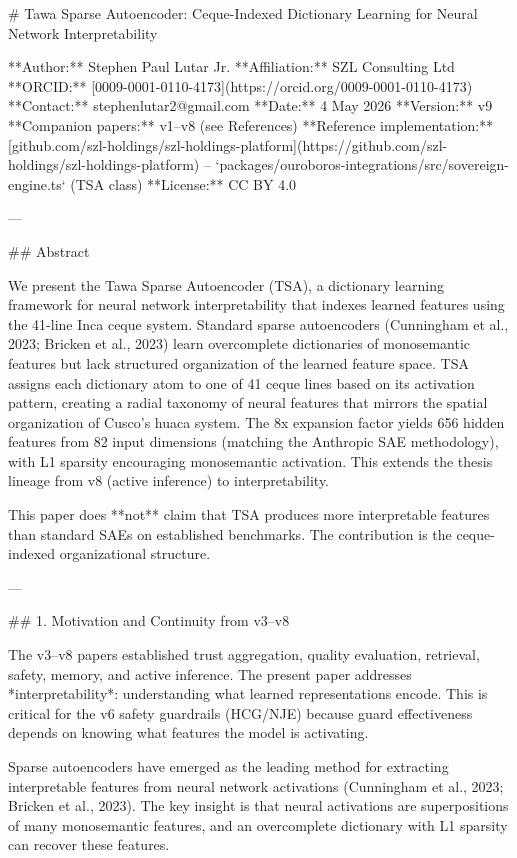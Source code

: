 # Tawa Sparse Autoencoder: Ceque-Indexed Dictionary Learning for Neural Network Interpretability

**Author:** Stephen Paul Lutar Jr.
**Affiliation:** SZL Consulting Ltd
**ORCID:** [0009-0001-0110-4173](https://orcid.org/0009-0001-0110-4173)
**Contact:** stephenlutar2@gmail.com
**Date:** 4 May 2026
**Version:** v9
**Companion papers:** v1--v8 (see References)
**Reference implementation:** [github.com/szl-holdings/szl-holdings-platform](https://github.com/szl-holdings/szl-holdings-platform) -- `packages/ouroboros-integrations/src/sovereign-engine.ts` (TSA class)
**License:** CC BY 4.0

---

## Abstract

We present the Tawa Sparse Autoencoder (TSA), a dictionary learning framework for neural network interpretability that indexes learned features using the 41-line Inca ceque system. Standard sparse autoencoders (Cunningham et al., 2023; Bricken et al., 2023) learn overcomplete dictionaries of monosemantic features but lack structured organization of the learned feature space. TSA assigns each dictionary atom to one of 41 ceque lines based on its activation pattern, creating a radial taxonomy of neural features that mirrors the spatial organization of Cusco's huaca system. The 8x expansion factor yields 656 hidden features from 82 input dimensions (matching the Anthropic SAE methodology), with L1 sparsity encouraging monosemantic activation. This extends the thesis lineage from v8 (active inference) to interpretability.

This paper does **not** claim that TSA produces more interpretable features than standard SAEs on established benchmarks. The contribution is the ceque-indexed organizational structure.

---

## 1. Motivation and Continuity from v3--v8

The v3--v8 papers established trust aggregation, quality evaluation, retrieval, safety, memory, and active inference. The present paper addresses *interpretability*: understanding what learned representations encode. This is critical for the v6 safety guardrails (HCG/NJE) because guard effectiveness depends on knowing what features the model is activating.

Sparse autoencoders have emerged as the leading method for extracting interpretable features from neural network activations (Cunningham et al., 2023; Bricken et al., 2023). The key insight is that neural activations are superpositions of many monosemantic features, and an overcomplete dictionary with L1 sparsity can recover these features.

